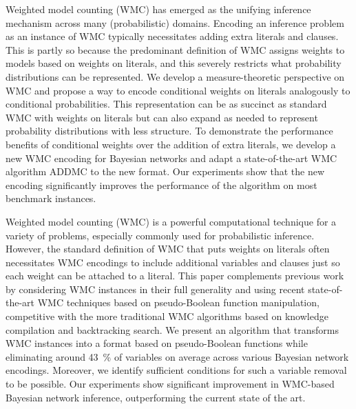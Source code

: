 \begin{displayquote}
\end{displayquote}



Weighted model counting (WMC) has emerged as the unifying inference mechanism across many (probabilistic) domains. Encoding an inference problem as an instance of WMC typically necessitates adding extra literals and clauses. This is partly so because the predominant definition of WMC assigns weights to models based on weights on literals, and this severely restricts what probability distributions can be represented. We develop a measure-theoretic perspective on WMC and propose a way to encode conditional weights on literals analogously to conditional probabilities. This representation can be as succinct as standard WMC with weights on literals but can also expand as needed to represent probability distributions with less structure. To demonstrate the performance benefits of conditional weights over the addition of extra literals, we develop a new WMC encoding for Bayesian networks and adapt a state-of-the-art WMC algorithm \textsf{ADDMC} to the new format. Our experiments show that the new encoding significantly improves the performance of the algorithm on most benchmark instances.

\begin{displayquote}
\end{displayquote}

Weighted model counting (WMC) is a powerful computational technique for a variety of problems, especially commonly used for probabilistic inference. However, the standard definition of WMC that puts weights on literals often necessitates WMC encodings to include additional variables and clauses just so each weight can be attached to a literal. This paper complements previous work by considering WMC instances in their full generality and using recent state-of-the-art WMC techniques based on pseudo-Boolean function manipulation, competitive with the more traditional WMC algorithms based on knowledge compilation and backtracking search. We present an algorithm that transforms WMC instances into a format based on pseudo-Boolean functions while eliminating around \SI{43}{\percent} of variables on average across various Bayesian network encodings. Moreover, we identify sufficient conditions for such a variable removal to be possible. Our experiments show significant improvement in WMC-based Bayesian network inference, outperforming the current state of the art.

